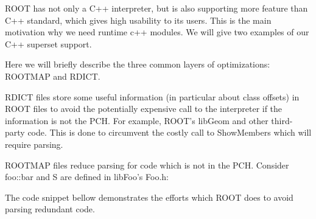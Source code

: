 \documentclass{webofc}
\begin{document}
ROOT has not only a C++ interpreter, but is also supporting more feature than C++ standard, which gives high usability to its users. This is the main motivation why we need runtime c++ modules. We will give two examples of our C++ superset support.

Here we will briefly describe the three common layers of optimizations: ROOTMAP and RDICT.

RDICT files store some useful information (in particular about class offsets) in ROOT files to avoid the potentially expensive call to the interpreter if the information is not the PCH. For example, ROOT’s libGeom and other third-party code. This is done to circumvent the costly call to ShowMembers which will require parsing.

ROOTMAP files reduce parsing for code which is not in the PCH. Consider
foo::bar and S are defined in libFoo's Foo.h:
\begin{listing}[h]
    \noindent
    \begin{minipage}[h]{\textwidth}
    \begin{cppcode*}{}
    // Foo.h
    namespace foo { struct bar{}; }
    struct S{};

    # libFoo.rootmap
    { decls }
    namespace foo { }
    struct S;
 
    [ libFoo.so ]
    # List of selected classes
    class bar
    struct S

    // G__Foo.cxx (aka libFoo dictionary)
    namespace {
      void TriggerDictionaryInitialization_libFoo_Impl() {
        static const char* headers[] = {"Foo.h"}
        // More scaffolding
        extern int __Cling_Autoloading_Map;
        namespace foo{struct __attribute__((annotate("$clingAutoload$Foo.h"))) bar;}
        struct __attribute__((annotate("$clingAutoload$Foo.h"))) S;
       // More initialization scaffolding.
    }
    \end{cppcode*}
    \end{minipage}
\end{listing}

The code snippet bellow demonstrates the efforts which ROOT does to
avoid parsing redundant code.
\begin{listing}[h]
    \noindent
    \begin{minipage}[h]{.7\textwidth}
    \end{minipage}
\end{listing}
\end{document}
